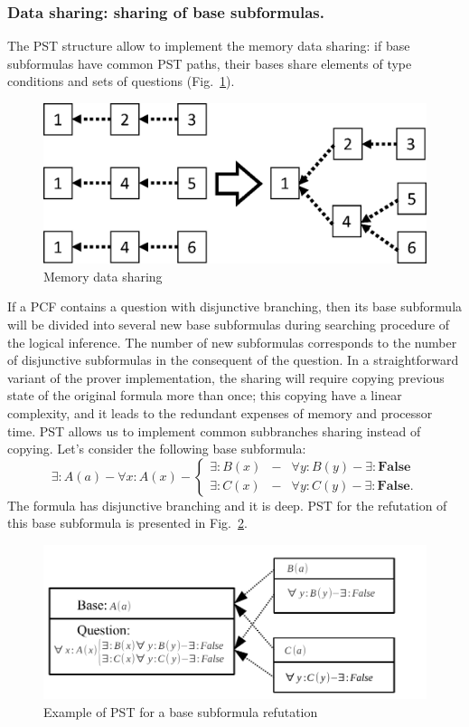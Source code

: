 \documentclass[runningheads,a4paper]{llncs}
\begin{document}
\subsubsection{Data sharing: sharing of base subformulas.}
The PST structure allow to implement the memory data sharing: if base subformulas have common PST paths, their bases share elements of type conditions and sets of questions (Fig.~\ref{fig:datasharing1}).
\begin{figure}[h]
  \vspace{0.5cm}
  \centering
  \includegraphics[width=0.4\linewidth]{img/Graphsp1.eps}
  \caption{Memory data sharing}
  \label{fig:datasharing1}
\end{figure}

If a PCF contains a question with disjunctive branching, then its base subformula will be divided into several new base subformulas during searching procedure of the logical inference. The number of new subformulas corresponds to the number of disjunctive subformulas in the consequent of the question. In a straightforward variant of the prover implementation, the sharing will require copying previous state of the original formula more than once; this copying have a linear complexity, and it leads to the redundant expenses of memory and processor time. PST allows us to implement common subbranches sharing instead of copying. Let's consider the following base subformula:
$$\exists: A(a) - \forall x: A(x) - \left\{
\begin{array}{lcl}
 \exists \colon B(x) & - & \forall y: B(y) - \exists\colon\boldsymbol{False}\\
 \exists \colon C(x) & - & \forall y: C(y) - \exists\colon\boldsymbol{False}.
\end{array}
\right. $$
The formula has disjunctive branching and it is deep. PST for the refutation of this base subformula is presented in Fig.~\ref{fig:datasharing2}.
\begin{figure}[h]
  \vspace{0.5cm}
  \centering
  \includegraphics[width=0.82\linewidth]{img/DataSharing2}
  \caption{Example of PST for a base subformula refutation}
  \label{fig:datasharing2}
\end{figure}
\end{document}
